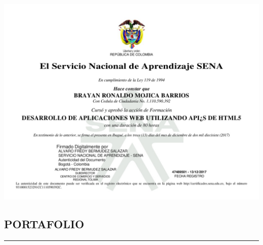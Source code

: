 \documentclass[letterpaper]{twentysecondcv} %
\begin{document}
\newpage
\makesidebarcommon
\includegraphics[width=\textwidth]{img/appwebhtml5.jpg} 
\newpage
\makesidebarcommon
\begin{center}
\section{PORTAFOLIO}
\end{center}
\noindent\rule{1\textwidth}{1.4pt}
\end{document}
